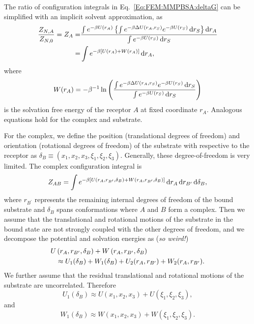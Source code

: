 The ratio of configuration integrals in Eq.~\ref{Eq:FEM:MMPBSA:deltaG} can be simplified with an implicit solvent approximation, as
\begin{align}
	\frac{Z_{N,A}}{Z_{N,0}}=Z_A=&\frac{\int e^{-\beta U(r_A)}\left\{\int e^{-\beta\Delta U(r_A,r_S)}e^{-\beta U(r_S)}\mathop{}\!\mathrm{d} r_S\right\}\mathop{}\!\mathrm{d} r_A}{\int e^{-\beta U(r_S)}\mathop{}\!\mathrm{d} r_S}\notag\\
	                           =&\int e^{-\beta \left[U(r_A)+W(r_A)\right]}\mathop{}\!\mathrm{d} r_A,
\end{align}
where
\begin{equation}
	W(r_A)=-\beta^{-1}\ln{\left(\frac{\int e^{-\beta\Delta U(r_A,r_S)}e^{-\beta U(r_S)}\mathop{}\!\mathrm{d}r_S}{\int e^{-\beta U(r_S)}\mathop{}\!\mathrm{d}r_S}\right)}
\end{equation}
is the solvation free energy of the receptor $A$ at fixed coordinate $r_A$. Analogous equations hold for the complex and substrate.

For the complex, we define the position (translational degrees of freedom) and orientation (rotational degrees of freedom) of the substrate with respective to the receptor as $\delta_B\equiv\left(x_1,x_2,x_3,\xi_1,\xi_2,\xi_3\right)$. Generally, these degree-of-freedom is very limited. The complex configuration integral is 
\begin{equation}
	Z_{AB}=\int e^{-\beta\left[U\left(r_A,r_{B^\prime},\delta_B\right)+W\left(r_A,r_{B^\prime},\delta_B\right)\right]}\mathop{}\!\mathrm{d} r_A\mathop{}\!\mathrm{d} r_{B^\prime}\mathop{}\!\mathrm{d}\delta_B,
\end{equation}
where $r_{B^\prime}$ represents the remaining internal degrees of freedom of the bound substrate and $\delta_B$ spans conformations where $A$ and $B$ form a complex. 
Then we assume that the translational and rotational motions of the substrate in the bound state are not strongly coupled with the other degrees of freedom, and we decompose the potential and solvation energies as (\textit{so weird!})
\begin{align}
	U&\left(r_A,r_{B^\prime},\delta_B\right)+W\left(r_A,r_{B^\prime},\delta_B\right)\notag\\
	 &\approx U_1(\delta_B) + W_1(\delta_B) +U_2(r_A,r_{B^\prime})+W_2(r_A,r_{B^\prime}).
\end{align}
We further assume that the residual translational and rotational motions of the substrate are uncorrelated. Therefore
\begin{equation}
	U_1(\delta_B) \approx U(x_1,x_2,x_3) + U(\xi_1,\xi_2,\xi_3),
\end{equation}
and
\begin{equation}
	W_1(\delta_B) \approx W(x_1,x_2,x_3) + W(\xi_1,\xi_2,\xi_3).
\end{equation}


